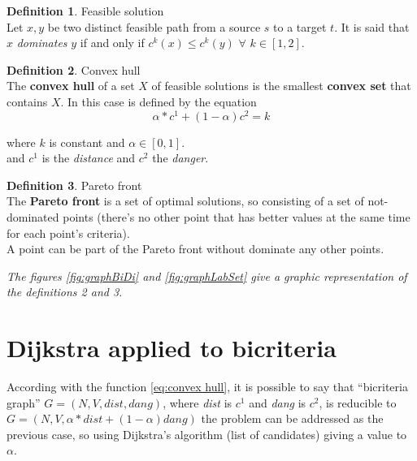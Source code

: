 \documentclass[a4paper,11pt]{report}
\begin{document}
\theoremstyle{definition}
\newtheorem{definition}{Definition}
\begin{definition}{Feasible solution}\\
	Let $x, y$ be two distinct feasible path from a source $s$ to a target $t$. It is said that $x$ \emph{dominates} $y$ if and only if $c^k(x) \leq c^k(y)$ $\forall$ $k \in [1,2]$.
\end{definition}

\theoremstyle{definition}
\begin{definition}{Convex hull}\\
	The \textbf{convex hull} of a set $X$ of feasible solutions is the smallest \textbf{convex set} that contains $X$. In this case is defined by the equation 
	\begin{equation}\label{eq:convex hull}
	\alpha*c^1 + (1-\alpha) c^2 = k
	\end{equation}
	\begin{center}
		where $k$ is constant and $\alpha \in [0, 1]$.\\
		and $c^1$ is the \textit{distance} and $c^2$ the \textit{danger}.
	\end{center}
\end{definition}

\begin{definition}{Pareto front}\\
	The \textbf{Pareto front} is a set of optimal solutions, so consisting of a set of not-dominated points (there's no other point that has better values at the same time for each point's criteria).
	\\A point can be part of the Pareto front without dominate any other points.
\end{definition}
{\small \textit{The figures \ref{fig:graphBiDi} and \ref{fig:graphLabSet} give a graphic representation of the definitions 2 and 3.}}

\section{Dijkstra applied to bicriteria}
According with the function \ref{eq:convex hull}, it is possible to say that ``bicriteria graph'' $G=(N,V,dist,dang)$, where \textit{dist} is $c^1$ and \textit{dang} is $c^2$, is reducible to $G=(N,V,\alpha*dist + (1-\alpha) dang)$  the problem can be addressed as the previous case, so using Dijkstra's algorithm (list of candidates) giving a value to $\alpha$. \\
\end{document}
